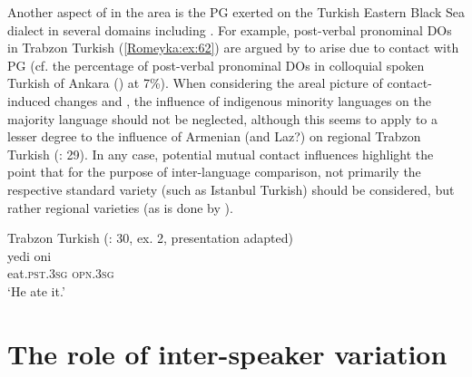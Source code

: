 \documentclass[output=paper,colorlinks,citecolor=brown]{langscibook}
\begin{document}
Another aspect of  in the area is the  PG exerted on the Turkish Eastern Black Sea dialect in several domains including  \citep{brendemoen1998,brendemoen1999,brendemoen2005,brendemoen2006,brendemoen2019}. For example, post-verbal pronominal DOs in Trabzon Turkish (\ref{Romeyka:ex:62}) are argued by \citet[30]{brendemoen2005} to arise due to contact with PG (cf. the percentage of post-verbal pronominal DOs in colloquial spoken Turkish of Ankara (\citealt{iefremenko2021oghuz}) at 7\%). When considering the areal picture of contact-induced changes and , the influence of indigenous minority languages on the majority language should not be neglected, although this seems to apply to a lesser degree to the influence of Armenian (and Laz?) on regional Trabzon Turkish (\citealt{brendemoen2005}: 29). In any case, potential mutual contact influences highlight the point that for the purpose of inter-language comparison, not primarily the respective standard variety (such as Istanbul Turkish) should be considered, but rather regional varieties (as is done by \citealt{neocleous_word_2020}).

\ea\label{Romeyka:ex:62}
Trabzon Turkish (\citealt{brendemoen2005}: 30, ex. 2, presentation adapted) \\
\gll  yedi oni \\
eat\textsc{.pst.3sg} \textsc{opn.3sg} \\
\glt `He ate it.'
\z

\section{The role of inter-speaker variation}\label{Romeyka:ss:6}
\end{document}
